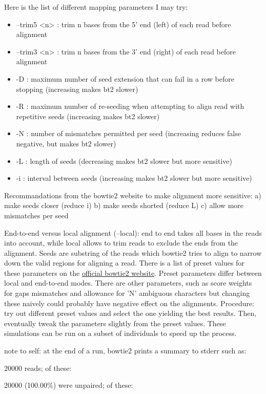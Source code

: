 \documentclass[10pt,a4paper]{report}
\begin{document}
Here is the list of different mapping parameters I may try:
\begin{itemize}
\item --trim5 <n> : trim n bases from the 5' end (left) of each read before alignment
\item --trim3 <n> : trim n bases from the 3' end (right) of each read before alignment
\item -D : maximum number of seed extension that can fail in a row before stopping (increasing makes bt2 slower)
\item -R : maximum number of re-seeding when attempting to align read with repetitive seeds (increasing makes bt2 slower)
\item -N : number of mismatches permitted per seed (increasing reduces false negative, but makes bt2 slower)
\item -L : length of seeds (decreasing makes bt2 slower but more sensitive)
\item -i : interval between seeds (increasing makes bt2 slower but more sensitive)
\end{itemize}

Recommandations from the bowtie2 website to make alignment more sensitive: 
a) make seeds closer (reduce i)
b) make seeds shorted (reduce L)
c) allow more mismatches per seed

End-to-end versus local alignment (--local): end to end takes all bases in the reads into account, while local allows to trim reads to exclude the ends from the alignment.
Seeds are substring of the reads which bowtie2 tries to align to narrow down the valid regions for aligning a read. There is a list of preset values for these parameters on the \href{http://bowtie-bio.sourceforge.net/bowtie2/manual.shtml#preset-options-in---end-to-end-mode}{official bowtie2 website}. Preset parameters differ between local and end-to-end modes.
There are other parameters, such as score weights for gaps mismatches and allowance for 'N' ambiguous characters but changing these naively could probably have negative effect on the alignments.
Procedure: try out different preset values and select the one yielding the best results. Then, eventually tweak the parameters slightly from the preset values. These simulations can be run on a subset of individuals to speed up the process.

note to self: at the end of a run, bowtie2 prints a summary to stderr such as:

20000 reads; of these:

  20000 (100.00\%) were unpaired; of these:
  
\end{document}
